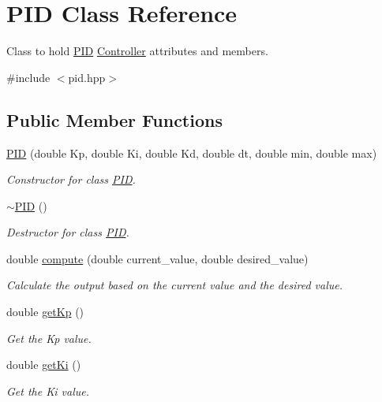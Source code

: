 \hypertarget{classPID}{}\section{P\+ID Class Reference}
\label{classPID}


Class to hold \hyperlink{classPID}{P\+ID} \hyperlink{classController}{Controller} attributes and members.  




{\ttfamily \#include $<$pid.\+hpp$>$}

\subsection*{Public Member Functions}
\begin{DoxyCompactItemize}
\item 
\hyperlink{classPID_a74e83c18b71000d5e9d9ff4f0832045c}{P\+ID} (double Kp, double Ki, double Kd, double dt, double min, double max)
\begin{DoxyCompactList}\small\item\em Constructor for class \hyperlink{classPID}{P\+ID}. \end{DoxyCompactList}\item 
\mbox{\label{classPID_ab7d389fc5b88d881bc25f5dafd360441}} 
\hyperlink{classPID_ab7d389fc5b88d881bc25f5dafd360441}{$\sim$\+P\+ID} ()
\begin{DoxyCompactList}\small\item\em Destructor for class \hyperlink{classPID}{P\+ID}. \end{DoxyCompactList}\item 
double \hyperlink{classPID_acb5ef99f0f57357393fd3556a413afe9}{compute} (double current\+\_\+value, double desired\+\_\+value)
\begin{DoxyCompactList}\small\item\em Calculate the output based on the current value and the desired value. \end{DoxyCompactList}\item 
double \hyperlink{classPID_a52625de61b1b2977b2c26ddb2698f14e}{get\+Kp} ()
\begin{DoxyCompactList}\small\item\em Get the Kp value. \end{DoxyCompactList}\item 
double \hyperlink{classPID_a89dedae29ef5a1359fd438824523bfc5}{get\+Ki} ()
\begin{DoxyCompactList}\small\item\em Get the Ki value. \end{DoxyCompactList}\item 

\end{DoxyCompactItemize}
